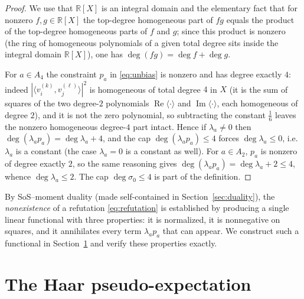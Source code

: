 \documentclass{amsart}
\theoremstyle{definition}
\theoremstyle{remark}
\begin{document}
\begin{proof}
We use that $\mathbb{R}[X]$ is an integral domain and the elementary fact that for nonzero
$f,g\in\mathbb{R}[X]$ the top-degree homogeneous part of $fg$ equals the product of the
top-degree homogeneous parts of $f$ and $g$; since this product is nonzero (the ring of
homogeneous polynomials of a given total degree sits inside the integral domain
$\mathbb{R}[X]$), one has $\deg(fg)=\deg f+\deg g$.

For $a\in A_4$ the constraint $p_a$ in \eqref{eq:unbias} is nonzero and has degree exactly
$4$: indeed $|\langle v^{(k)}_i,v^{(\ell)}_j\rangle|^2$ is homogeneous of total degree $4$ in
$X$ (it is the sum of squares of the two degree-$2$ polynomials
$\operatorname{Re}\langle\cdot\rangle$ and $\operatorname{Im}\langle\cdot\rangle$, each
homogeneous of degree $2$), and it is not the zero polynomial, so subtracting the constant
$\tfrac16$ leaves the nonzero homogeneous degree-$4$ part intact. Hence if $\lambda_a\ne0$
then $\deg(\lambda_a p_a)=\deg\lambda_a+4$, and the cap $\deg(\lambda_a p_a)\le4$ forces
$\deg\lambda_a\le0$, i.e.\ $\lambda_a$ is a constant (the case $\lambda_a=0$ is a constant as
well). For $a\in A_2$, $p_a$ is nonzero of degree exactly $2$, so the same reasoning gives
$\deg(\lambda_a p_a)=\deg\lambda_a+2\le4$, whence $\deg\lambda_a\le2$. The cap
$\deg\sigma_0\le 4$ is part of the definition. \qedhere
\end{proof}

By SoS--moment duality (made self-contained in Section~\ref{sec:duality}), the
\emph{nonexistence} of a refutation \eqref{eq:refutation} is established by producing a single
linear functional with three properties: it is normalized, it is nonnegative on squares, and it
annihilates every term $\lambda_a p_a$ that can appear. We construct such a functional in
Section~\ref{sec:pe} and verify these properties exactly.

\section{The Haar pseudo-expectation}\label{sec:pe}
\end{document}
